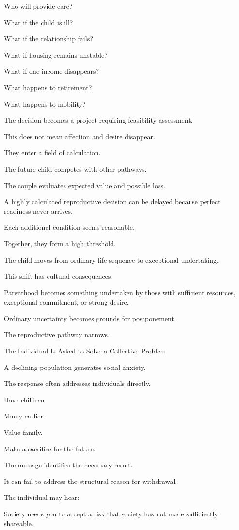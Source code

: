 Who will provide care?

What if the child is ill?

What if the relationship fails?

What if housing remains unstable?

What if one income disappears?

What happens to retirement?

What happens to mobility?

The decision becomes a project requiring feasibility assessment.

This does not mean affection and desire disappear.

They enter a field of calculation.

The future child competes with other pathways.

The couple evaluates expected value and possible loss.

A highly calculated reproductive decision can be delayed because perfect readiness never arrives.

Each additional condition seems reasonable.

Together, they form a high threshold.

The child moves from ordinary life sequence to exceptional undertaking.

This shift has cultural consequences.

Parenthood becomes something undertaken by those with sufficient resources, exceptional commitment, or strong desire.

Ordinary uncertainty becomes grounds for postponement.

The reproductive pathway narrows.

The Individual Is Asked to Solve a Collective Problem

A declining population generates social anxiety.

The response often addresses individuals directly.

Have children.

Marry earlier.

Value family.

Make a sacrifice for the future.

The message identifies the necessary result.

It can fail to address the structural reason for withdrawal.

The individual may hear:

Society needs you to accept a risk that society has not made sufficiently shareable.

